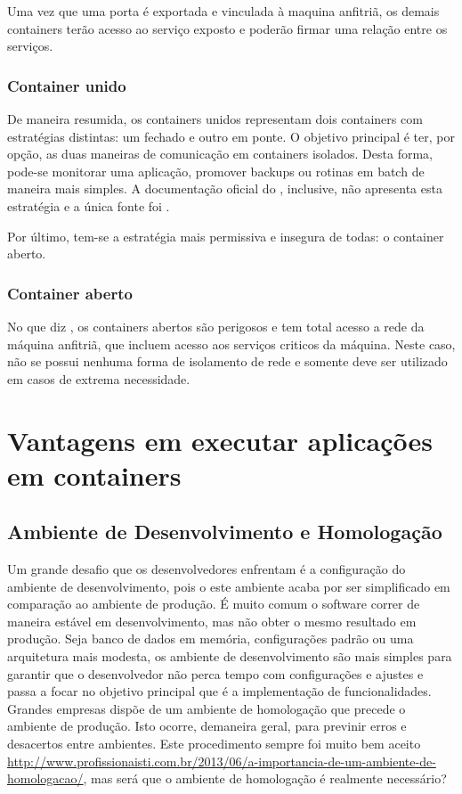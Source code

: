 \documentclass[
	12pt,				%
	openright,			%
	oneside,			%
	a4paper,			%
	chapter=TITLE,		%
	section=TITLE,		%
	english,			%
	french,				%
	spanish,			%
	brazil				%
	]{abntex2}
\begin{document}
Uma vez que uma porta é exportada e vinculada à maquina anfitriã, os demais containers terão acesso ao serviço exposto e poderão firmar uma relação entre os serviços.

\subsubsection{Container unido}

De maneira resumida, os containers unidos representam dois containers com estratégias distintas: um fechado e outro em ponte. O objetivo principal é ter, por opção, as duas maneiras de comunicação em containers isolados. Desta forma, pode-se monitorar uma aplicação, promover backups ou rotinas em batch de maneira mais simples. A documentação oficial do , inclusive, não apresenta esta estratégia e a única fonte foi .

Por último, tem-se a estratégia mais permissiva e insegura de todas: o container aberto.

\subsubsection{Container aberto}

No que diz , os containers abertos são perigosos e tem total acesso a rede da máquina anfitriã, que incluem acesso aos serviços criticos da máquina. Neste caso, não se possui nenhuma forma de isolamento de rede e somente deve ser utilizado em casos de extrema necessidade. 

\section{Vantagens em executar aplicações em containers}

\subsection{Ambiente de Desenvolvimento e Homologação}

Um grande desafio que os desenvolvedores enfrentam é a configuração do ambiente de desenvolvimento, pois o este ambiente acaba por ser simplificado em comparação ao ambiente de produção. É muito comum o software correr de maneira estável em desenvolvimento, mas não obter o mesmo resultado em produção. Seja banco de dados em memória, configurações padrão ou uma arquitetura mais modesta, os ambiente de desenvolvimento são mais simples para garantir que o desenvolvedor não perca tempo com configurações e ajustes e passa a focar no objetivo principal que é a implementação de funcionalidades.
Grandes empresas dispõe de um ambiente de homologação que precede o ambiente de produção. Isto ocorre, demaneira geral, para previnir erros e desacertos entre ambientes. Este procedimento sempre foi muito bem aceito \url{http://www.profissionaisti.com.br/2013/06/a-importancia-de-um-ambiente-de-homologacao/}, mas será que o ambiente de homologação é realmente necessário?
\end{document}
